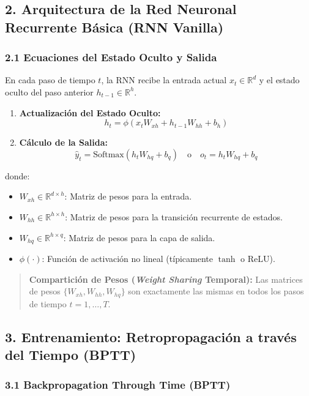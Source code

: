 \subsection{2. Arquitectura de la Red Neuronal Recurrente Básica (RNN Vanilla)}

\subsubsection{2.1 Ecuaciones del Estado Oculto y Salida}

En cada paso de tiempo $t$, la RNN recibe la entrada actual $x_t \in \mathbb{R}^d$ y el estado oculto del paso anterior $h_{t-1} \in \mathbb{R}^h$.

\begin{enumerate}
	\item \textbf{Actualización del Estado Oculto:}
	$$h_t = \phi\left(x_t W_{xh} + h_{t-1} W_{hh} + b_h\right)$$
	
	\item \textbf{Cálculo de la Salida:}
	$$\hat{y}_t = \text{Softmax}\left(h_t W_{hq} + b_q\right) \quad \text{o} \quad o_t = h_t W_{hq} + b_q$$
\end{enumerate}

donde:
\begin{itemize}
	\item $W_{xh} \in \mathbb{R}^{d \times h}$: Matriz de pesos para la entrada.
	\item $W_{hh} \in \mathbb{R}^{h \times h}$: Matriz de pesos para la transición recurrente de estados.
	\item $W_{hq} \in \mathbb{R}^{h \times q}$: Matriz de pesos para la capa de salida.
	\item $\phi(\cdot)$: Función de activación no lineal (típicamente $\tanh$ o $\text{ReLU}$).
\end{itemize}

\begin{quote}
	\textbf{Compartición de Pesos (\emph{Weight Sharing} Temporal):} Las matrices de pesos $\{W_{xh}, W_{hh}, W_{hq}\}$ son exactamente las mismas en todos los pasos de tiempo $t=1, \dots, T$.
\end{quote}

\subsection{3. Entrenamiento: Retropropagación a través del Tiempo (BPTT)}

\subsubsection{3.1 Backpropagation Through Time (BPTT)}

